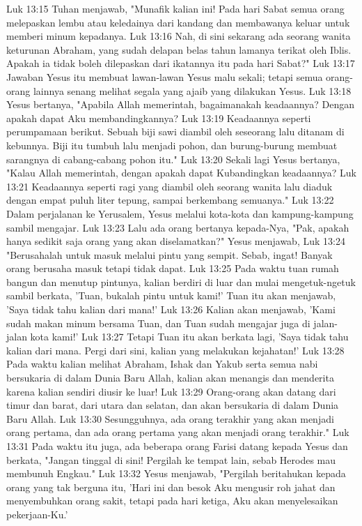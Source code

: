 Luk 13:15  Tuhan menjawab, "Munafik kalian ini! Pada hari Sabat semua orang melepaskan lembu atau keledainya dari kandang dan membawanya keluar untuk memberi minum kepadanya.
Luk 13:16  Nah, di sini sekarang ada seorang wanita keturunan Abraham, yang sudah delapan belas tahun lamanya terikat oleh Iblis. Apakah ia tidak boleh dilepaskan dari ikatannya itu pada hari Sabat?"
Luk 13:17  Jawaban Yesus itu membuat lawan-lawan Yesus malu sekali; tetapi semua orang-orang lainnya senang melihat segala yang ajaib yang dilakukan Yesus.
Luk 13:18  Yesus bertanya, "Apabila Allah memerintah, bagaimanakah keadaannya? Dengan apakah dapat Aku membandingkannya?
Luk 13:19  Keadaannya seperti perumpamaan berikut. Sebuah biji sawi diambil oleh seseorang lalu ditanam di kebunnya. Biji itu tumbuh lalu menjadi pohon, dan burung-burung membuat sarangnya di cabang-cabang pohon itu."
Luk 13:20  Sekali lagi Yesus bertanya, "Kalau Allah memerintah, dengan apakah dapat Kubandingkan keadaannya?
Luk 13:21  Keadaannya seperti ragi yang diambil oleh seorang wanita lalu diaduk dengan empat puluh liter tepung, sampai berkembang semuanya."
Luk 13:22  Dalam perjalanan ke Yerusalem, Yesus melalui kota-kota dan kampung-kampung sambil mengajar.
Luk 13:23  Lalu ada orang bertanya kepada-Nya, "Pak, apakah hanya sedikit saja orang yang akan diselamatkan?" Yesus menjawab,
Luk 13:24  "Berusahalah untuk masuk melalui pintu yang sempit. Sebab, ingat! Banyak orang berusaha masuk tetapi tidak dapat.
Luk 13:25  Pada waktu tuan rumah bangun dan menutup pintunya, kalian berdiri di luar dan mulai mengetuk-ngetuk sambil berkata, 'Tuan, bukalah pintu untuk kami!' Tuan itu akan menjawab, 'Saya tidak tahu kalian dari mana!'
Luk 13:26  Kalian akan menjawab, 'Kami sudah makan minum bersama Tuan, dan Tuan sudah mengajar juga di jalan-jalan kota kami!'
Luk 13:27  Tetapi Tuan itu akan berkata lagi, 'Saya tidak tahu kalian dari mana. Pergi dari sini, kalian yang melakukan kejahatan!'
Luk 13:28  Pada waktu kalian melihat Abraham, Ishak dan Yakub serta semua nabi bersukaria di dalam Dunia Baru Allah, kalian akan menangis dan menderita karena kalian sendiri diusir ke luar!
Luk 13:29  Orang-orang akan datang dari timur dan barat, dari utara dan selatan, dan akan bersukaria di dalam Dunia Baru Allah.
Luk 13:30  Sesungguhnya, ada orang terakhir yang akan menjadi orang pertama, dan ada orang pertama yang akan menjadi orang terakhir."
Luk 13:31  Pada waktu itu juga, ada beberapa orang Farisi datang kepada Yesus dan berkata, "Jangan tinggal di sini! Pergilah ke tempat lain, sebab Herodes mau membunuh Engkau."
Luk 13:32  Yesus menjawab, "Pergilah beritahukan kepada orang yang tak berguna itu, 'Hari ini dan besok Aku mengusir roh jahat dan menyembuhkan orang sakit, tetapi pada hari ketiga, Aku akan menyelesaikan pekerjaan-Ku.'
